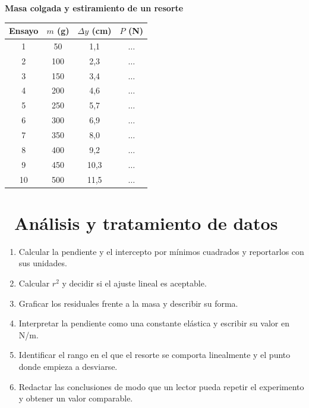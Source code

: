 \documentclass[11pt,a4paper]{article}
\newcommand{\iconotexto}[2]{\textcolor{cyanNeon}{\faIcon{#1}}~#2}
\begin{document}
\begin{center}
\begin{minipage}{\linewidth}
\centering
{\small
\textbf{Masa colgada y estiramiento de un resorte}\par\smallskip
\begin{tabular}{@{}cccc@{}}
\toprule
Ensayo & $m$ (g) & $\Delta y$ (cm) & $P$ (N) \\
\midrule
1 & 50 & 1,1 & $\ldots$ \\
2 & 100 & 2,3 & $\ldots$ \\
3 & 150 & 3,4 & $\ldots$ \\
4 & 200 & 4,6 & $\ldots$ \\
5 & 250 & 5,7 & $\ldots$ \\
6 & 300 & 6,9 & $\ldots$ \\
7 & 350 & 8,0 & $\ldots$ \\
8 & 400 & 9,2 & $\ldots$ \\
9 & 450 & 10,3 & $\ldots$ \\
10 & 500 & 11,5 & $\ldots$ \\
\bottomrule
\end{tabular}
}\par{}
\end{minipage}
\end{center}

\section{\iconotexto{calculator}{Análisis y tratamiento de datos}}

\begin{enumerate}[leftmargin=1.4em,itemsep=2pt,topsep=3pt]
  \item Calcular la pendiente y el intercepto por mínimos cuadrados y reportarlos con sus unidades.
  \item Calcular $r^2$ y decidir si el ajuste lineal es aceptable.
  \item Graficar los residuales frente a la masa y describir su forma.
  \item Interpretar la pendiente como una constante elástica y escribir su valor en N/m.
  \item Identificar el rango en el que el resorte se comporta linealmente y el punto donde empieza a desviarse.
  \item Redactar las conclusiones de modo que un lector pueda repetir el experimento y obtener un valor comparable.
\end{enumerate}
\end{document}
